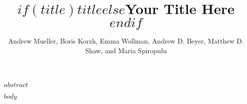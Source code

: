 \documentclass{optica-article}
\begin{document}
\title{$if(title)$$title$$else$Your Title Here$endif$}

\author{Andrew Mueller, Boris Korzh, Emma Wollman, Andrew D. Beyer, Matthew D. Shaw, and Maria Spiropulu}

\address{Applied Physics, California Institute of Technology, 1200 E California Blvd., Pasadena, CA, 91125, USA \\
Jet Propulsion Laboratory, California Institute of Technology, 4800 Oak Grove Dr., Pasadena, CA, 91109, USA \\
Division of Physics, Mathematics and Astronomy, California Institute of Technology, 1200 E California Blvd., Pasadena, CA 91125, USA }



\begin{abstract*} 
$abstract$
\end{abstract*}

$body$


\end{document}
